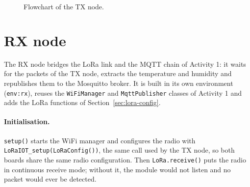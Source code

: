 \documentclass[informe,english]{plantilla}
\begin{document}
\begin{figure}[htbp]
    \centering
    \caption{Flowchart of the TX node.}
    \label{fig:tx-flow}
\end{figure}

\section{RX node}
\label{sec:rx}

The RX node bridges the LoRa link and the MQTT chain of Activity 1: it waits for the packets of the TX node, extracts the temperature and humidity and republishes them to the Mosquitto broker. It is built in its own environment (\texttt{env:rx}), reuses the \texttt{WiFiManager} and \texttt{MqttPublisher} classes of Activity 1 and adds the LoRa functions of Section~\ref{sec:lora-config}.

\paragraph{Initialisation.} \texttt{setup()} starts the WiFi manager and configures the radio with \texttt{LoRaIOT\_setup(LoRaConfig())}, the same call used by the TX node, so both boards share the same radio configuration. Then \texttt{LoRa.receive()} puts the radio in continuous receive mode; without it, the module would not listen and no packet would ever be detected.
\end{document}
